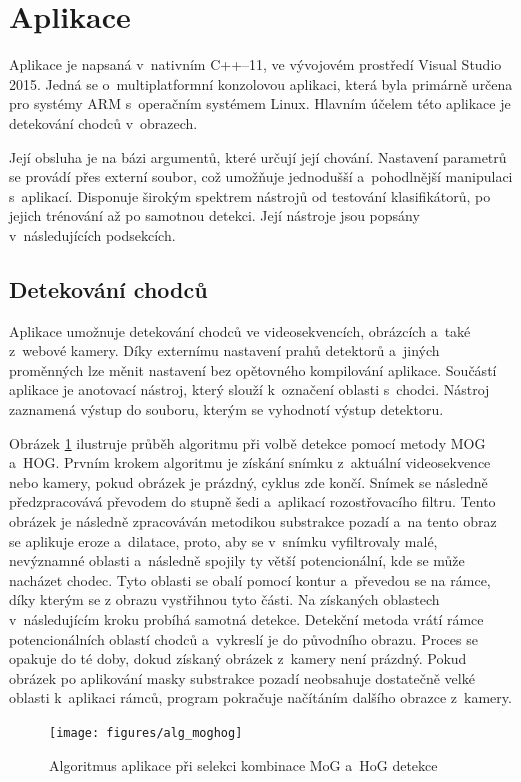 \section{Aplikace}
Aplikace je napsaná v~nativním C++--11, ve vývojovém prostředí Visual Studio 2015. Jedná se o~multiplatformní konzolovou aplikaci, která byla primárně určena pro systémy ARM s~operačním systémem Linux. Hlavním účelem této aplikace je detekování chodců v~obrazech.

Její obsluha je na bázi argumentů, které určují její chování. Nastavení parametrů se provádí přes externí soubor, což umožňuje jednodušší a~pohodlnější manipulaci s~aplikací. Disponuje širokým spektrem nástrojů od testování klasifikátorů, po jejich trénování až po samotnou detekci. Její nástroje jsou popsány v~následujících podsekcích.

\subsection{Detekování chodců}
Aplikace umožnuje detekování chodců ve videosekvencích, obrázcích a~také z~webové kamery. Díky externímu nastavení prahů detektorů a~jiných proměnných lze měnit nastavení bez opětovného kompilování aplikace. Součástí aplikace je anotovací nástroj, který slouží k~označení oblasti s~chodci. Nástroj zaznamená výstup do souboru, kterým se vyhodnotí výstup detektoru.
 
Obrázek \ref{mog_algorithm} ilustruje průběh algoritmu při volbě detekce pomocí metody MOG a~HOG. Prvním krokem algoritmu je získání snímku z~aktuální videosekvence nebo kamery, pokud obrázek je prázdný, cyklus zde končí. Snímek se následně předzpracovává převodem do stupně šedi a~aplikací rozostřovacího filtru. Tento obrázek je následně zpracováván metodikou substrakce pozadí a~na tento obraz se aplikuje eroze a~dilatace, proto, aby se v~snímku vyfiltrovaly malé, nevýznamné oblasti a~následně spojily ty větší potencionální, kde se může nacházet chodec. Tyto oblasti se obalí pomocí kontur a~převedou se na rámce, díky kterým se z obrazu vystřihnou tyto části. Na získaných oblastech v~následujícím kroku probíhá samotná detekce. Detekční metoda vrátí rámce potencionálních oblastí chodců a~vykreslí je do původního obrazu. Proces se opakuje do té doby, dokud získaný obrázek z~kamery není prázdný. Pokud obrázek po aplikování masky substrakce pozadí neobsahuje dostatečně velké oblasti k~aplikaci rámců, program pokračuje načítáním dalšího obrazce z~kamery.  

\begin{figure}[H]
\centering
\texttt{[image: figures/alg\_moghog]}
\caption{Algoritmus aplikace při selekci kombinace MoG a~HoG detekce}
\label{mog_algorithm}
\end{figure}

